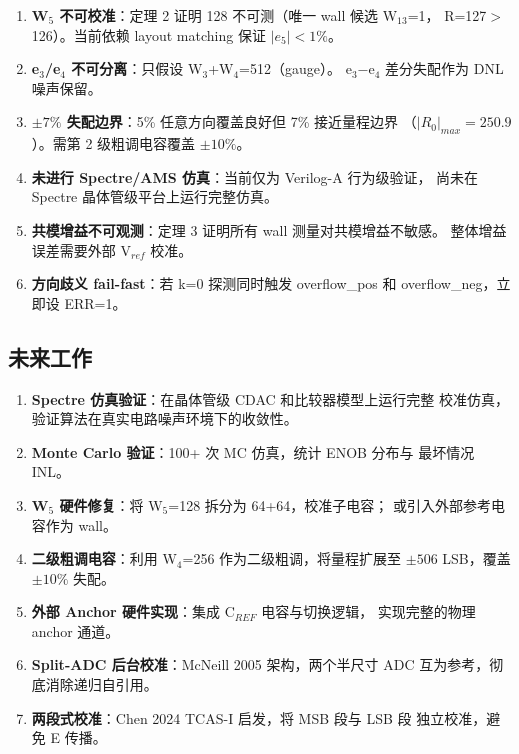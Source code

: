 \documentclass[UTF8,a4paper,12pt]{ctexart}
\theoremstyle{definition}
\begin{document}
\begin{enumerate}
  \item \textbf{W$_5$ 不可校准}：定理 2 证明 128 不可测（唯一 wall 候选 W$_{13}$=1，
    R=127$>$126）。当前依赖 layout matching 保证 $|e_5| < 1\%$。
  \item \textbf{e$_3$/e$_4$ 不可分离}：只假设 W$_3$+W$_4$=512（gauge）。
    e$_3$$-$e$_4$ 差分失配作为 DNL 噪声保留。
  \item \textbf{$\pm 7\%$ 失配边界}：5\% 任意方向覆盖良好但 7\% 接近量程边界
    （$|R_0|_{max}=250.9$）。需第 2 级粗调电容覆盖 $\pm 10\%$。
  \item \textbf{未进行 Spectre/AMS 仿真}：当前仅为 Verilog-A 行为级验证，
    尚未在 Spectre 晶体管级平台上运行完整仿真。
  \item \textbf{共模增益不可观测}：定理 3 证明所有 wall 测量对共模增益不敏感。
    整体增益误差需要外部 V$_{ref}$ 校准。
  \item \textbf{方向歧义 fail-fast}：若 k=0 探测同时触发 overflow\_pos 和
    overflow\_neg，立即设 ERR=1。
\end{enumerate}

\subsection{未来工作}

\begin{enumerate}
  \item \textbf{Spectre 仿真验证}：在晶体管级 CDAC 和比较器模型上运行完整
    校准仿真，验证算法在真实电路噪声环境下的收敛性。
  \item \textbf{Monte Carlo 验证}：100+ 次 MC 仿真，统计 ENOB 分布与
    最坏情况 INL。
  \item \textbf{W$_5$ 硬件修复}：将 W$_5$=128 拆分为 64+64，校准子电容；
    或引入外部参考电容作为 wall。
  \item \textbf{二级粗调电容}：利用 W$_4$=256 作为二级粗调，将量程扩展至
    $\pm 506$ LSB，覆盖 $\pm 10\%$ 失配。
  \item \textbf{外部 Anchor 硬件实现}：集成 C$_{REF}$ 电容与切换逻辑，
    实现完整的物理 anchor 通道。
  \item \textbf{Split-ADC 后台校准}：McNeill 2005 架构，两个半尺寸 ADC
    互为参考，彻底消除递归自引用。
  \item \textbf{两段式校准}：Chen 2024 TCAS-I 启发，将 MSB 段与 LSB 段
    独立校准，避免 E 传播。
\end{enumerate}

\end{document}
